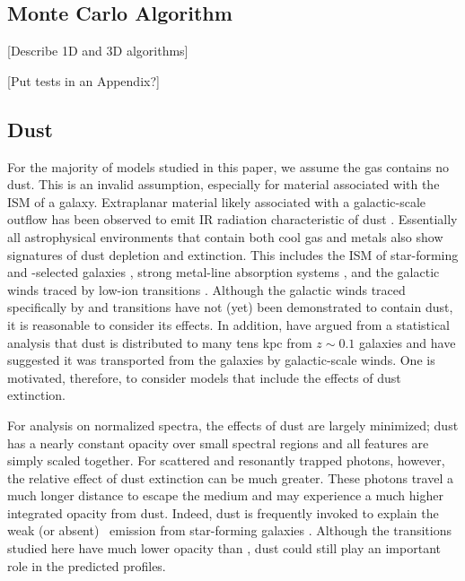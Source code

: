 \documentclass[12pt,preprint]{aastex}
\begin{document}
\subsection{Monte Carlo Algorithm}

[Describe 1D and 3D algorithms]

[Put tests in an Appendix?]

\subsection{Dust}
\label{sec:dust_method}

For the majority of models studied in this paper, we assume the gas
contains no dust.
This is an invalid assumption, especially for material associated with
the ISM of a galaxy.  
Extraplanar material likely associated with a galactic-scale 
outflow has been observed to emit IR radiation characteristic of dust \citep[e.g.][]{M87_dust}.
Essentially all astrophysical environments that contain both cool gas
and metals also show signatures of dust depletion and extinction.  This includes the
ISM of star-forming and -selected galaxies
\citep[e.g.][]{ss96,pw01,pcd+07}, strong  metal-line
absorption systems \citep{ykv+06,mnt+08}, and the galactic winds traced
by low-ion transitions \citep{prs+02,rvs05b}.  Although the galactic winds
traced specifically by  and  transitions have not (yet) been
demonstrated to contain dust, it is reasonable to consider its
effects.
In addition, \cite{msf+10} have argued from a statistical analysis
that dust is distributed to many tens kpc from $z \sim 0.1$ galaxies
and have suggested it was transported from the galaxies by
galactic-scale winds.  One is motivated, therefore, to consider
models that include the effects of dust extinction.

For analysis on normalized spectra, the effects of dust are largely minimized; 
dust has a nearly constant opacity over small spectral regions and all
features are simply scaled together.
For scattered and resonantly trapped photons, however, the relative effect of dust
extinction can be much greater.  
These photons travel a much longer distance to escape the medium and
may experience a much higher integrated opacity from dust.
Indeed, dust is frequently invoked to
explain the weak (or absent) \lya\ emission from star-forming galaxies
\citep[e.g.][]{shapley03}.  Although the transitions studied here have
much lower opacity than \lya, dust could still play an important role
in the predicted profiles.
\end{document}
